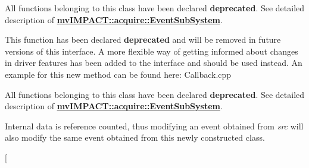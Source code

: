 \begin{DoxyRefList}
\item[\label{deprecated__deprecated000035}%
\hypertarget{deprecated__deprecated000035}{}%
成员 \hyperlink{classmv_i_m_p_a_c_t_1_1acquire_1_1_event_sub_system_a3f2509bbadd74548d28460908ad5754c}{mv\+I\+M\+P\+A\+C\+T\+:\+:acquire\+:\+:Event\+Sub\+System\+:\+:get\+Event\+Count} (void) const ]All functions belonging to this class have been declared {\bfseries deprecated}. See detailed description of {\bfseries \hyperlink{classmv_i_m_p_a_c_t_1_1acquire_1_1_event_sub_system}{mv\+I\+M\+P\+A\+C\+T\+::acquire\+::\+Event\+Sub\+System}}.  
\item[\label{deprecated__deprecated000036}%
\hypertarget{deprecated__deprecated000036}{}%
成员 \hyperlink{classmv_i_m_p_a_c_t_1_1acquire_1_1_event_sub_system_a18be5407d1c6b041f55f9854712e8c61}{mv\+I\+M\+P\+A\+C\+T\+:\+:acquire\+:\+:Event\+Sub\+System\+:\+:M\+V\+I\+M\+P\+A\+C\+T\+\_\+\+D\+E\+P\+R\+E\+C\+A\+T\+E\+D\+\_\+\+C\+P\+P} (Event\+Wait\+Results wait\+For(int timeout\+\_\+ms, T\+Device\+Event\+Type mask))]This function has been declared {\bfseries deprecated} and will be removed in future versions of this interface. A more flexible way of getting informed about changes in driver features has been added to the interface and should be used instead. An example for this new method can be found here\+: Callback.\+cpp 
\item[\label{deprecated__deprecated000028}%
\hypertarget{deprecated__deprecated000028}{}%
成员 \hyperlink{classmv_i_m_p_a_c_t_1_1acquire_1_1_event_sub_system_a89aef19fe3be239f2280f65d865dd32a}{mv\+I\+M\+P\+A\+C\+T\+:\+:acquire\+:\+:Event\+Sub\+System\+:\+:M\+V\+I\+M\+P\+A\+C\+T\+\_\+\+D\+E\+P\+R\+E\+C\+A\+T\+E\+D\+\_\+\+C\+P\+P} (Event\+Sub\+System(\+Device $\ast$p\+Dev))]All functions belonging to this class have been declared {\bfseries deprecated}. See detailed description of {\bfseries \hyperlink{classmv_i_m_p_a_c_t_1_1acquire_1_1_event_sub_system}{mv\+I\+M\+P\+A\+C\+T\+::acquire\+::\+Event\+Sub\+System}}.  
\item[\label{deprecated__deprecated000031}%
\hypertarget{deprecated__deprecated000031}{}%
成员 \hyperlink{classmv_i_m_p_a_c_t_1_1acquire_1_1_event_sub_system_a3f60f59e43ab58f591f73d871778d6b1}{mv\+I\+M\+P\+A\+C\+T\+:\+:acquire\+:\+:Event\+Sub\+System\+:\+:operator=} (const Event\+Sub\+System \&rhs)]Internal data is reference counted, thus modifying an event obtained from {\itshape src} will also modify the same event obtained from this newly constructed class.  
\item[\label{deprecated__deprecated000030}%
\hypertarget{deprecated__deprecated000030}{}%

\end{DoxyRefList}
